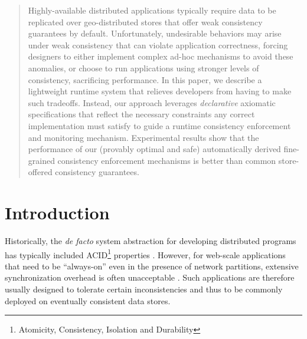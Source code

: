 \documentclass[authorversion]{sig-alternate-05-2015}
\begin{document}

\maketitle


\begin{abstract}
  Highly-available distributed applications
  typically require data to be replicated over geo-distributed
  stores that offer weak consistency guarantees by default.
  Unfortunately, undesirable behaviors may arise under weak
  consistency that can violate application correctness, forcing
  designers to either implement complex ad-hoc mechanisms to avoid these
  anomalies, or choose to run applications using stronger levels of
  consistency, sacrificing performance. 
  In this paper, we describe a lightweight runtime system that relieves
  developers from having to make such tradeoffs.  Instead, our
  approach leverages \emph{declarative} axiomatic specifications that reflect
  the necessary constraints any correct implementation must satisfy to
  guide a runtime consistency enforcement and monitoring mechanism.
  Experimental results show that the performance of our (provably optimal and safe) automatically
  derived fine-grained consistency enforcement mechanisms is better than 
  common store-offered consistency guarantees.
\end{abstract}








\section{Introduction}

Historically, the \emph{de facto} system abstraction for developing distributed
programs has typically included ACID\footnote{Atomicity, Consistency,
Isolation and Durability} properties  \cite{papa,lin}.
However, for web-scale applications that need to be “always-on” even
in the presence of network partitions, extensive
synchronization overhead is often unacceptable \cite{cap}.
Such applications are therefore usually designed to tolerate certain
inconsistencies and thus to be commonly deployed on eventually consistent data stores.
\end{document}
